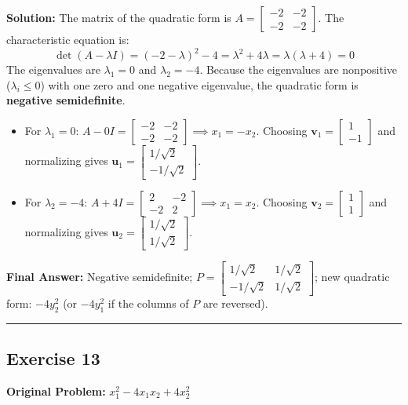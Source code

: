 \documentclass[11pt, letterpaper]{article}
\theoremstyle{definition}
\theoremstyle{remark}
\begin{document}
\textbf{Solution:}
The matrix of the quadratic form is $A = \begin{bmatrix} -2 & -2 \\ -2 & -2 \end{bmatrix}$.
The characteristic equation is:
\[
\det(A - \lambda I) = (-2 - \lambda)^2 - 4 = \lambda^2 + 4\lambda = \lambda(\lambda + 4) = 0
\]
The eigenvalues are $\lambda_1 = 0$ and $\lambda_2 = -4$. Because the eigenvalues are nonpositive ($\lambda_i \le 0$) with one zero and one negative eigenvalue, the quadratic form is \textbf{negative semidefinite}.
\begin{itemize}
    \item For $\lambda_1 = 0$: $A - 0I = \begin{bmatrix} -2 & -2 \\ -2 & -2 \end{bmatrix} \implies x_1 = -x_2$. Choosing $\mathbf{v}_1 = \begin{bmatrix} 1 \\ -1 \end{bmatrix}$ and normalizing gives $\mathbf{u}_1 = \begin{bmatrix} 1/\sqrt{2} \\ -1/\sqrt{2} \end{bmatrix}$.
    \item For $\lambda_2 = -4$: $A + 4I = \begin{bmatrix} 2 & -2 \\ -2 & 2 \end{bmatrix} \implies x_1 = x_2$. Choosing $\mathbf{v}_2 = \begin{bmatrix} 1 \\ 1 \end{bmatrix}$ and normalizing gives $\mathbf{u}_2 = \begin{bmatrix} 1/\sqrt{2} \\ 1/\sqrt{2} \end{bmatrix}$.
\end{itemize}
\textbf{Final Answer:} Negative semidefinite; $P = \begin{bmatrix} 1/\sqrt{2} & 1/\sqrt{2} \\ -1/\sqrt{2} & 1/\sqrt{2} \end{bmatrix}$; new quadratic form: $-4y_2^2$ (or $-4y_1^2$ if the columns of $P$ are reversed).

\medskip\hrule\medskip

\subsection*{Exercise 13}
\textbf{Original Problem:} $x_1^2 - 4x_1x_2 + 4x_2^2$
\end{document}
